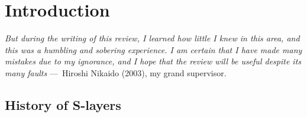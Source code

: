 \acresetall

\chapter{Introduction}
\label{ch:Introduction}

\begin{epigraph}
    \emph{But during the writing of this review, I learned how little I knew in this area, and this was a humbling and sobering experience. I am certain that I have made many mistakes due to my ignorance, and I hope that the review will be useful despite its many faults} ---~Hiroshi Nikaido (2003), my grand supervisor.
\end{epigraph}

\section{History of S-layers} %
\label{sec:history_of_s_layers}
   

